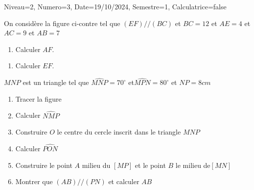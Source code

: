 \documentclass[a4paper,12pt]{article}
\begin{document}
\begin{Maquette}[DS]{Niveau=2, Numero=3, Date=19/10/2024, Semestre=1, Calculatrice=false}

\begin{exercice}
\begin{minipage}{0.6\linewidth}
On considère la figure ci-contre tel que $(EF) // (BC)$  et $BC=12$ et $AE=4$ et $AC=9$ et $AB=7$
\begin{enumerate}
\item{} Calculer  $AF$.
\end{enumerate}
\end{minipage}
\begin{minipage}{0.4\linewidth}
\end{minipage}
\begin{enumerate}
\item{} Calculer  $EF$.
\end{enumerate}
\end{exercice}

\begin{exercice}
$MNP$ est un triangle tel que  $\widehat{MNP}=70^{\circ}$ et$\widehat{MPN}=80^{\circ}$ et $NP=8 cm$
\begin{enumerate}
\item{} Tracer la figure
\item{} Calculer $\widehat{NMP}$
\item{} Construire  $O$ le centre du cercle inscrit dans le triangle $MNP$
\item{} Calculer $\widehat{PON}$
\item{} Construire le point  $A$ milieu du  $[MP]$ et le point $B$ le milieu de$[MN]$
\item{} Montrer que $(AB) // (PN)$ et calculer $AB$
\end{enumerate}
\end{exercice}
\end{Maquette}
\end{document}
